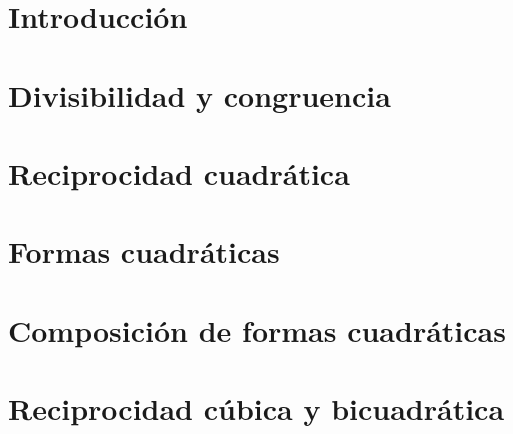 \part*{Introducci\'on}


\pagebreak
\part{Divisibilidad y congruencia}\label{pt:divisibilidad-y-congruencia}


\pagebreak
\part{Reciprocidad cuadr\'atica}\label{pt:reciprocidad-cuadratica}


\pagebreak
\part{Formas cuadr\'aticas}\label{pt:formas}


\pagebreak
\part{Composici\'on de formas cuadr\'aticas}\label{pt:composicion}


\pagebreak
\part{Reciprocidad c\'ubica y bicuadr\'atica}\label{pt:reciprocidad-superior}



\pagebreak
\printbibliography[heading=bibintoc,title=\refname]

\pagebreak
\tableofcontents
